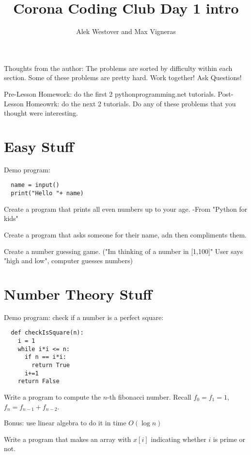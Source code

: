 \documentclass{article}[11pt]
\author{Alek Westover and Max Vigneras}
\title{Corona Coding Club Day 1 intro}
\begin{document}
\maketitle

Thoughts from the author: 
The problems are sorted by difficulty within each section.
Some of these problems are pretty hard.
Work together! Ask Questions!

Pre-Lesson Homework: do the first 2 pythonprogramming.net tutorials.
Post-Lesson Homeowrk: do the next 2 tutorials. Do any of these problems that you thought were interesting.

\section{Easy Stuff}
Demo program: 
\begin{lstlisting}
  name = input()
  print("Hello "+ name)
\end{lstlisting}

\begin{q}
  Create a program that prints all even numbers up to your age.
  -From "Python for kids"
\end{q}

\begin{q}
  Create a program that asks someone for their name, adn then compliments them.
\end{q}

\begin{q}
  Create a number guessing game. ("Im thinking of a number in [1,100]" User says "high and low", computer guesses numbers)
\end{q}


\section{Number Theory Stuff}
Demo program: check if a number is a perfect square:
\begin{lstlisting}
  def checkIsSquare(n):
    i = 1
    while i*i <= n:
      if n == i*i:
        return True
      i+=1
    return False
\end{lstlisting}


\begin{q}
  Write a program to compute the $n$-th fibonacci number.
  Recall $f_0=f_1=1$, $f_n=f_{n-1}+ f_{n-2}$.

  Bonus: use linear algebra to do it in time $O(\log n)$
\end{q}

\begin{q}
  Write a program that makes an array with $x[i]$ indicating whether $i$ is prime or not.
\end{q}
\end{document}
